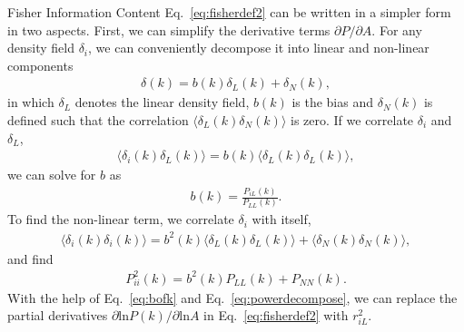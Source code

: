 \begin{section}{Fisher Information Content}
  Eq.~\ref{eq:fisherdef2} can be written in a simpler
  form in two aspects.   First, we can simplify the derivative terms
  $\partial P/\partial A$.  For any density field $\delta_i$, we can
  conveniently decompose it into linear and non-linear components
  \begin{align}
    \delta(k) = b (k) \delta _L (k) + \delta_{N}(k),
    \label{eq:decompose}
  \end{align}
  in which $\delta_L$ denotes the linear density field, $b(k)$ is the
  bias and $\delta_{N}(k)$ is defined such that the correlation
  $\langle \delta_L(k)\delta_{N}(k) \rangle$ is zero.  If we correlate
  $\delta_i$ and $\delta_L$,
  \begin{align}
    \langle \delta_i(k)\delta_L(k) \rangle = b(k) \langle \delta_L(k)\delta_L(k) \rangle,
    \label{eq:correlating}
  \end{align} 
  we can solve for $b$ as
  \begin{align}
    b (k) = \frac{P _{iL}(k)}{P_{LL}(k)}.
    \label{eq:bofk}
  \end{align}
  To find the non-linear term, we correlate $\delta_i$ with itself,
  \begin{align}
    \langle \delta_i(k) \delta_i(k) \rangle = 
    b^2(k) \langle \delta_L(k) \delta_L(k) \rangle + \langle \delta_{N}(k)\delta_{N}(k) \rangle,
  \end{align}
  and find
  \begin{align}
    P_{ii}^2 (k) = b^2(k) P_{LL} (k) + P_{NN} (k).
    \label{eq:powerdecompose}
  \end{align}
  With the help of Eq.~\ref{eq:bofk} and Eq.~\ref{eq:powerdecompose},
  we can replace the partial derivatives
  $\partial \mathrm{ln} P(k) / \partial \mathrm{ln} A$ in
  Eq.~\ref{eq:fisherdef2} with $r^2_{iL}$.


\end{section}
